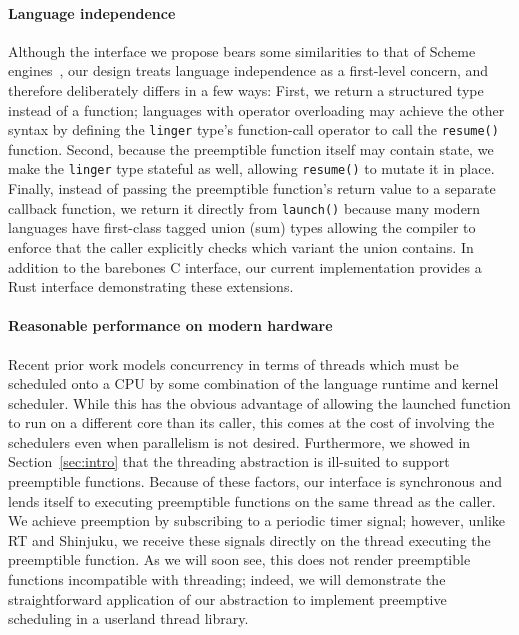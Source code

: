 \paragraph{Language independence}
Although the interface we propose bears some similarities to that of Scheme
engines~\cite{haynes:iucs1984}, our design treats language independence as a
first-level concern, and therefore deliberately differs in a few ways:  First, we
return a structured type instead of a function; languages with operator overloading
may achieve the other syntax by defining the \texttt{linger} type's function-call
operator to call the \texttt{resume()} function.  Second, because the preemptible
function itself may contain state, we make the \texttt{linger} type stateful as well,
allowing \texttt{resume()} to mutate it in place.  Finally, instead of passing the
preemptible function's return value to a separate callback function, we return it
directly from \texttt{launch()} because many modern languages have first-class tagged
union (sum) types allowing the compiler to enforce that the caller explicitly checks
which variant the union contains.  In addition to the barebones C interface, our
current implementation provides a Rust interface demonstrating these extensions.

\paragraph{Reasonable performance on modern hardware}
Recent prior work models concurrency in terms of threads which must be scheduled onto
a CPU by some combination of the language runtime and kernel scheduler.  While this
has the obvious advantage of allowing the launched function to run on a different
core than its caller, this comes at the cost of involving the schedulers even when
parallelism is not desired.  Furthermore, we showed in Section~\ref{sec:intro} that
the threading abstraction is ill-suited to support preemptible functions.  Because of
these factors, our interface is synchronous and lends itself to executing preemptible
functions on the same thread as the caller.  We achieve preemption by subscribing to
a periodic timer signal; however, unlike RT and Shinjuku, we receive these signals
directly on the thread executing the preemptible function.  As we will soon see, this
does not render preemptible functions incompatible with threading; indeed, we will
demonstrate the straightforward application of our abstraction to implement
preemptive scheduling in a userland thread library.

